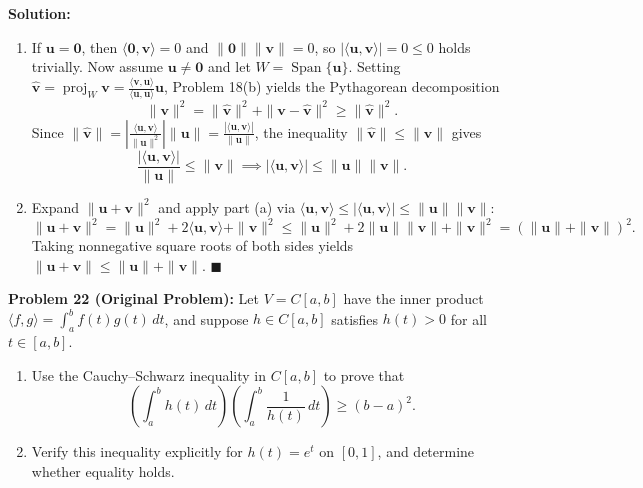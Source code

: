 \documentclass[11pt, letterpaper]{article}
\theoremstyle{definition}
\theoremstyle{remark}
\begin{document}
\textbf{Solution:}
\begin{enumerate}[label=(\alph*)]
    \item If $\mathbf{u} = \mathbf{0}$, then $\langle \mathbf{0}, \mathbf{v} \rangle = 0$ and $\|\mathbf{0}\|\|\mathbf{v}\| = 0$, so $|\langle \mathbf{u}, \mathbf{v} \rangle| = 0 \le 0$ holds trivially. Now assume $\mathbf{u} \neq \mathbf{0}$ and let $W = \operatorname{Span}\{\mathbf{u}\}$. Setting $\hat{\mathbf{v}} = \operatorname{proj}_W \mathbf{v} = \frac{\langle \mathbf{v}, \mathbf{u} \rangle}{\langle \mathbf{u}, \mathbf{u} \rangle}\mathbf{u}$, Problem 18(b) yields the Pythagorean decomposition
    \[
    \|\mathbf{v}\|^2 = \|\hat{\mathbf{v}}\|^2 + \|\mathbf{v} - \hat{\mathbf{v}}\|^2 \ge \|\hat{\mathbf{v}}\|^2.
    \]
    Since $\|\hat{\mathbf{v}}\| = \left|\frac{\langle \mathbf{u}, \mathbf{v} \rangle}{\|\mathbf{u}\|^2}\right| \|\mathbf{u}\| = \frac{|\langle \mathbf{u}, \mathbf{v} \rangle|}{\|\mathbf{u}\|}$, the inequality $\|\hat{\mathbf{v}}\| \le \|\mathbf{v}\|$ gives
    \[
    \frac{|\langle \mathbf{u}, \mathbf{v} \rangle|}{\|\mathbf{u}\|} \le \|\mathbf{v}\| \implies |\langle \mathbf{u}, \mathbf{v} \rangle| \le \|\mathbf{u}\|\|\mathbf{v}\|.
    \]
    \item Expand $\|\mathbf{u} + \mathbf{v}\|^2$ and apply part (a) via $\langle \mathbf{u}, \mathbf{v} \rangle \le |\langle \mathbf{u}, \mathbf{v} \rangle| \le \|\mathbf{u}\|\|\mathbf{v}\|$:
    \[
    \|\mathbf{u} + \mathbf{v}\|^2 = \|\mathbf{u}\|^2 + 2\langle \mathbf{u}, \mathbf{v} \rangle + \|\mathbf{v}\|^2 \le \|\mathbf{u}\|^2 + 2\|\mathbf{u}\|\|\mathbf{v}\| + \|\mathbf{v}\|^2 = (\|\mathbf{u}\| + \|\mathbf{v}\|)^2.
    \]
    Taking nonnegative square roots of both sides yields $\|\mathbf{u} + \mathbf{v}\| \le \|\mathbf{u}\| + \|\mathbf{v}\|$. $\blacksquare$
\end{enumerate}

\medskip

\textbf{Problem 22 (Original Problem):} Let $V = C[a, b]$ have the inner product $\langle f, g \rangle = \int_a^b f(t)g(t)\,dt$, and suppose $h \in C[a, b]$ satisfies $h(t) > 0$ for all $t \in [a, b]$.
\begin{enumerate}[label=(\alph*)]
    \item Use the Cauchy--Schwarz inequality in $C[a, b]$ to prove that
    \[
    \left(\int_a^b h(t)\,dt\right)\left(\int_a^b \frac{1}{h(t)}\,dt\right) \ge (b - a)^2.
    \]
    \item Verify this inequality explicitly for $h(t) = e^t$ on $[0, 1]$, and determine whether equality holds.
\end{enumerate}
\end{document}
